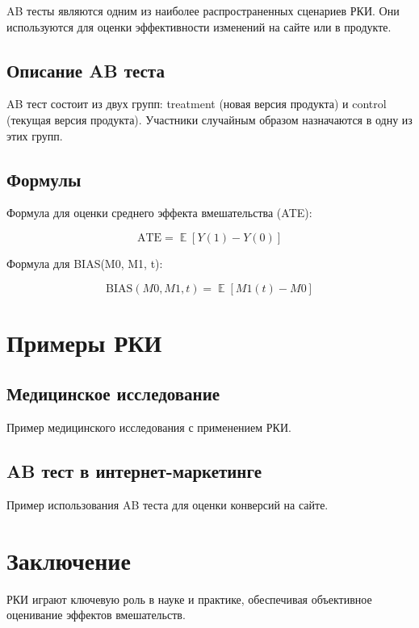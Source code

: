 \documentclass{article}
\DeclareMathOperator{\E}{\mathbb{E}} %
\begin{document}
        AB тесты являются одним из наиболее распространенных сценариев РКИ. Они используются для оценки эффективности изменений на сайте или в продукте.

    \subsection{Описание AB теста}

        AB тест состоит из двух групп: treatment (новая версия продукта) и control (текущая версия продукта). Участники случайным образом назначаются в одну из этих групп.

    \subsection{Формулы}

        Формула для оценки среднего эффекта вмешательства (ATE):

        \[
        \text{ATE} = \E[Y(1) - Y(0)]
        \]

        Формула для BIAS(M0, M1, t):

        \[
        \text{BIAS}(M0, M1, t) = \E[M1(t) - M0]
        \]

    \section{Примеры РКИ}

    \subsection{Медицинское исследование}

    Пример медицинского исследования с применением РКИ.

    \subsection{AB тест в интернет-маркетинге}

    Пример использования AB теста для оценки конверсий на сайте.

    \section{Заключение}

    РКИ играют ключевую роль в науке и практике, обеспечивая объективное оценивание эффектов вмешательств.
\end{document}
